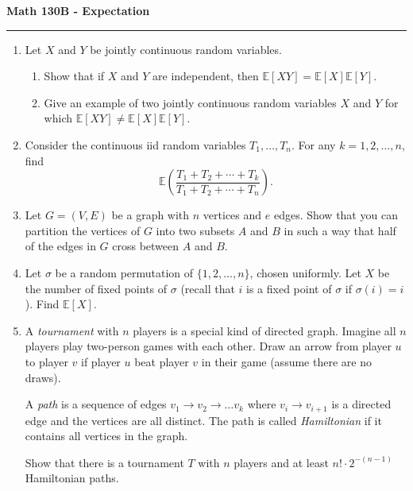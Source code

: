 \documentclass[11pt,letterpaper]{article}
\newcommand{\E}{\mathbb{E}}
\begin{document}
\begin{center}
{\bf \Large Math 130B - Expectation}
\vspace{0.2cm}
\hrule
\end{center}

\begin{enumerate}
	\item Let $X$ and $Y$ be jointly continuous random variables.
	\begin{enumerate}
		\item Show that if $X$ and $Y$ are independent, then $\E[XY] = \E[X]\E[Y]$.
		\vfill

		\item Give an example of two jointly continuous random variables $X$ and $Y$ for which $\E[XY] \neq \E[X]\E[Y]$.
	\end{enumerate}

	\vfill

	\item Consider the continuous iid random variables $T_1, \ldots, T_n$. For any $k = 1, 2, \ldots, n$, find
	\[
		\E\left(\frac{T_1 +T_2 + \cdots + T_k}{T_1 + T_2 + \cdots + T_n}\right).
	\]

	\vfill

	\item Let $G = (V,E)$ be a graph with $n$ vertices and $e$ edges. Show that you can partition the vertices of $G$ into two subsets $A$ and $B$ in such a way that half of the edges in $G$ cross between $A$ and $B$.

	\vfill

	\item Let $\sigma$ be a random permutation of $\{1, 2, \ldots, n\}$, chosen uniformly. Let $X$ be the number of fixed points of $\sigma$ (recall that $i$ is a fixed point of $\sigma$ if $\sigma(i) = i$). Find $\E[X]$.

	\vfill

	\item A \emph{tournament} with $n$ players is a special kind of directed graph. Imagine all $n$ players play two-person games with each other. Draw an arrow from player $u$ to player $v$ if player $u$ beat player $v$ in their game (assume there are no draws).

	A \emph{path} is a sequence of edges $v_1 \to v_2 \to \ldots v_k$ where $v_i \to v_{i+1}$ is a directed edge and the vertices are all distinct. The path is called \emph{Hamiltonian} if it contains all vertices in the graph.

	Show that there is a tournament $T$ with $n$ players and at least $n!\cdot 2^{-(n-1)}$ Hamiltonian paths.

	\vfill
\end{enumerate}
\end{document}
